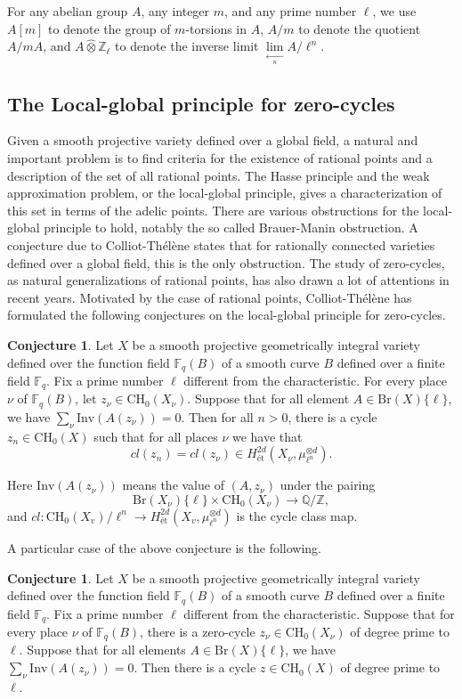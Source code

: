 \documentclass{amsart}
\theoremstyle{definition}
\newtheorem{conj}[theorem]{Conjecture}
\theoremstyle{remark}
\newcommand{\mbb}{\mathbb}
\newcommand{\FF}{\mbb{F}}
\newcommand{\QQ}{\mbb{Q}}
\newcommand{\ZZ}{\mbb{Z}}
\newcommand{\et}{\text{\'et}}
\begin{document}
For any abelian group $A$, any integer $m$, and any prime number $\ell$, we use $A[m]$ to denote the group of $m$-torsions in $A$,  $A/m$ to denote the quotient $A/mA$, and $A \hat{\otimes} \ZZ_\ell$ to denote the inverse limit $\lim \limits_{\xleftarrow[n]{}} A/\ell^n$.
 
\subsection{The Local-global principle for zero-cycles}


Given a smooth projective variety defined over a global field, a natural and important problem is to find criteria for the existence of rational points and a description of the set of all rational points. 
The Hasse principle and the weak approximation problem, or the local-global principle, gives a characterization of this set in terms of the adelic points.
 There are various obstructions for the local-global principle to hold, notably the so called Brauer-Manin obstruction. A conjecture due to Colliot-Th\'el\`ene states that for rationally connected varieties defined over a global field, this is the only obstruction.
The study of zero-cycles, as natural generalizations of rational points, has also drawn a lot of attentions in recent years.
Motivated by the case of rational points,
Colliot-Th\'el\`ene has formulated the following conjectures on the local-global principle for zero-cycles. 
\begin{conj}\cite[Conjecture 2.2]{CTLocalGlobalChow}\label{conj:CT1}
Let $X$ be a smooth projective geometrically integral variety defined over the function field $\FF_q(B)$ of a smooth curve $B$ defined over a finite field $\FF_q$. Fix a prime number $\ell$ different from the characteristic.
For every place $\nu$ of $\FF_q(B)$, let $z_\nu \in \text{CH}_0(X_\nu)$. 
Suppose that for all element $A\in \text{Br}(X)\{\ell\}$, we have $\sum_{\nu} \text{Inv}(A(z_\nu))=0$. Then for all $n>0$, there is a cycle $z_n \in \text{CH}_0(X)$ such that for all places $\nu$ we have that 
\[
cl(z_n) =cl(z_{\nu}) \in H^{2d}_{\text{\'et}}(X_{\nu}, \mu_{\ell^n}^{\otimes d}).
\]
\end{conj}
Here $\text{Inv}(A(z_\nu))$ means the value of $(A, z_\nu)$ under the pairing
\[
\text{Br}(X_\nu)\{\ell\} \times \text{CH}_0(X_\nu) \to \QQ/\ZZ,
\]
and $cl:\text{CH}_0(X_v)/\ell^n \to H^{2d}_\et(X_v, \mu_{\ell^n}^{\otimes d})$ is the cycle class map.

A particular case of the above conjecture is the following.
\begin{conj}\label{conj:CT2}
Let $X$ be a smooth projective geometrically integral variety defined over the function field $\FF_q(B)$ of a smooth curve $B$ defined over a finite field $\FF_q$. Fix a prime number $\ell$ different from the characteristic.
Suppose that for every place $\nu$ of $\FF_q(B)$, there is a zero-cycle $z_\nu \in \text{CH}_0(X_\nu)$ of degree prime to $\ell$. 
Suppose that for all elements $A\in \text{Br}(X)\{\ell\}$, we have 
$\sum_{\nu} \text{Inv}(A(z_\nu))=0$.
 Then there is a cycle $z \in \text{CH}_0(X)$ of degree prime to $\ell$.
\end{conj}
\end{document}
